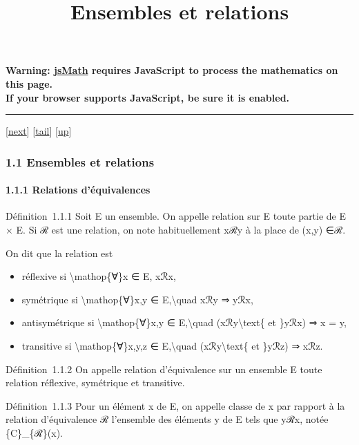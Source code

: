 \documentclass[]{article}
\title{Ensembles et relations}
\author{}
\date{}
\begin{document}
\maketitle

\textbf{Warning: \href{http://www.math.union.edu/locate/jsMath}{jsMath}
requires JavaScript to process the mathematics on this page.\\ If your
browser supports JavaScript, be sure it is enabled.}

\begin{center}\rule{3in}{0.4pt}\end{center}

{[}\href{coursse2.html}{next}{]}
{[}\hyperref[tailcoursse1.html]{tail}{]}
{[}\href{coursch2.html\#coursse1.html}{up}{]}

\subsubsection{1.1 Ensembles et relations}

\paragraph{1.1.1 Relations d'équivalences}

Définition~1.1.1 Soit E un ensemble. On appelle relation sur E toute
partie de E × E. Si ℛ est une relation, on note habituellement xℛy à la
place de (x,y) ∈ℛ.

On dit que la relation est

\begin{itemize}
\itemsep1pt\parskip0pt
\item
  réflexive si \textbackslash{}mathop\{∀\}x ∈ E, xℛx,
\item
  symétrique si \textbackslash{}mathop\{∀\}x,y ∈ E,\textbackslash{}quad
  xℛy ⇒ yℛx,
\item
  antisymétrique si \textbackslash{}mathop\{∀\}x,y ∈
  E,\textbackslash{}quad (xℛy\textbackslash{}text\{ et \}yℛx) ⇒ x = y,
\item
  transitive si \textbackslash{}mathop\{∀\}x,y,z ∈
  E,\textbackslash{}quad (xℛy\textbackslash{}text\{ et \}yℛz) ⇒ xℛz.
\end{itemize}

Définition~1.1.2 On appelle relation d'équivalence sur un ensemble E
toute relation réflexive, symétrique et transitive.

Définition~1.1.3 Pour un élément x de E, on appelle classe de x par
rapport à la relation d'équivalence ℛ l'ensemble des éléments y de E
tels que yℛx, notée \{C\}\_\{ℛ\}(x).
\end{document}
